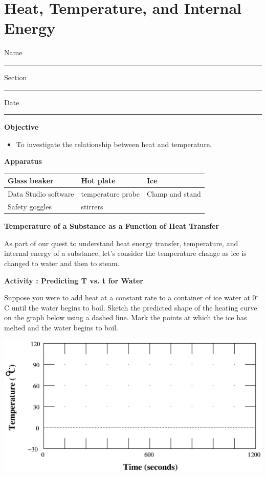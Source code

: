 \section{Heat, Temperature, and Internal Energy}

Name \rule{2.0in}{0.1pt}\hfill{}Section \rule{1.0in}{0.1pt}\hfill{}Date
\rule{1.0in}{0.1pt}

\textbf{Objective}

\begin{itemize}

\item To investigate the relationship between heat and temperature.

\end{itemize}

\textbf{Apparatus}

\begin{center}
\begin{tabular}{|l|l|l|} \hline
Glass beaker         & Hot plate            & Ice \\ \hline
Data Studio software & temperature probe    & Clamp and stand \\ \hline
Safety goggles       & stirrers             &           \\ \hline
\end{tabular}
\end{center}

\textbf{Temperature of a Substance as a Function of Heat Transfer}

As part of our quest to understand heat energy transfer, temperature,
and internal energy of a substance, let's consider the temperature
change as ice is changed to water and then to steam.

\textbf{Activity : Predicting T vs. t for Water} 

Suppose you were to add heat at a constant rate to a container of
ice water at 0\( ^{\circ } \)C until the water begins to boil. Sketch
the predicted shape of the heating curve on the graph below using
a dashed line. Mark the points at which the ice has melted and the
water begins to boil.

\vspace{0.3cm}
{\centering \includegraphics{heat/heat_temp_int_energy_fig_1.eps} \par}
\vspace{0.3cm}

